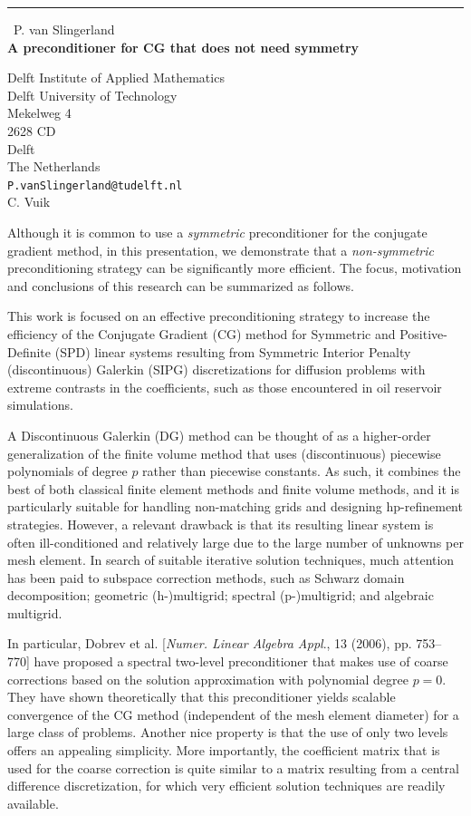 \documentclass{report}
\begin{document}
\begin{center}
\rule{6in}{1pt} \
{\large P. van Slingerland \\
{\bf A preconditioner for CG that does not need symmetry}}

Delft Institute of Applied Mathematics \\ Delft University of Technology \\ Mekelweg 4 \\ 2628 CD \\ Delft \\ The Netherlands
\\
{\tt P.vanSlingerland@tudelft.nl}\\
C. Vuik\end{center}

Although it is common to use a \emph{symmetric} preconditioner for the
conjugate gradient method, in this presentation, we demonstrate that a
\emph{non-symmetric} preconditioning strategy can be significantly more
efficient. The focus, motivation and conclusions of this research can be
summarized as follows.

This work is focused on an effective preconditioning strategy to increase
the efficiency of the Conjugate Gradient (CG) method for Symmetric and
Positive-Definite (SPD) linear systems resulting from Symmetric Interior
Penalty (discontinuous) Galerkin (SIPG) discretizations for diffusion
problems with extreme contrasts in the coefficients, such as those
encountered in oil reservoir simulations.

A Discontinuous Galerkin (DG) method can be thought of as a higher-order
generalization of the finite volume method that uses (discontinuous)
piecewise polynomials of degree $p$ rather than piecewise constants. As
such, it combines the best of both classical finite element methods and
finite volume methods, and it is particularly suitable for handling
non-matching grids and designing hp-refinement strategies. However, a
relevant drawback is that its resulting linear system is often
ill-conditioned and relatively large due to the large number of unknowns
per mesh element. In search of suitable iterative solution techniques,
much attention has been paid to subspace correction methods, such as
Schwarz domain decomposition; geometric \mbox{(h-)multigrid}; spectral
\mbox{(p-)multigrid}; and algebraic multigrid.

In particular, Dobrev et al. [\textit{Numer. Linear Algebra Appl}., 13
(2006), pp. 753--770] have proposed a spectral two-level preconditioner
that makes use of coarse corrections based on the solution approximation
with polynomial degree $p=0$. They have shown theoretically that this
preconditioner yields scalable convergence of the CG method (independent
of the mesh element diameter) for a large class of problems. Another nice
property is that the use of only two levels offers an appealing
simplicity. More importantly, the coefficient matrix that is used for the
coarse correction is quite similar to a matrix resulting from a central
difference discretization, for which very efficient solution techniques
are readily available.
\end{document}

